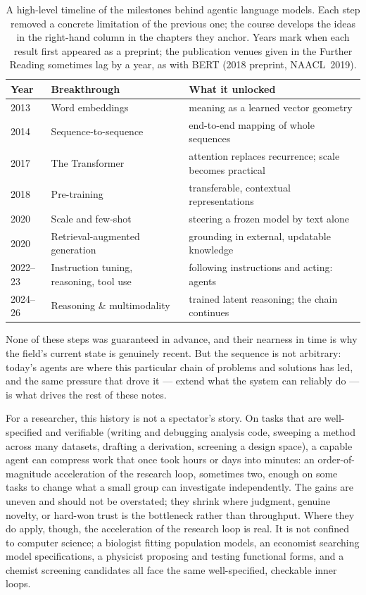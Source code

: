 \begin{table}[t]
\centering
\setlength{\belowcaptionskip}{8pt}
\caption{A high-level timeline of the milestones behind agentic language models.
Each step removed a concrete limitation of the previous one; the course develops the ideas in the right-hand column in the chapters they anchor.
Years mark when each result first appeared as a preprint; the publication venues given in the Further Reading sometimes lag by a year, as with BERT (2018 preprint, NAACL~2019).}
\label{table:AgenticTimeline}
\small
\begin{tabular}{@{}l l p{6.8cm}@{}}
\toprule
Year & Breakthrough & \raggedright What it unlocked \tabularnewline
\midrule
2013  & Word embeddings                   & \raggedright meaning as a learned vector geometry \tabularnewline
2014  & Sequence-to-sequence              & \raggedright end-to-end mapping of whole sequences \tabularnewline
2017  & The Transformer                   & \raggedright attention replaces recurrence; scale becomes practical \tabularnewline
2018  & Pre-training                      & \raggedright transferable, contextual representations \tabularnewline
2020  & Scale and few-shot                & \raggedright steering a frozen model by text alone \tabularnewline
2020  & Retrieval-augmented generation    & \raggedright grounding in external, updatable knowledge \tabularnewline
2022--23 & Instruction tuning, reasoning, tool use & \raggedright following instructions and acting: agents \tabularnewline
2024--26 & Reasoning \& multimodality     & \raggedright trained latent reasoning; the chain continues \tabularnewline
\bottomrule
\end{tabular}
\end{table}

None of these steps was guaranteed in advance, and their nearness in time is why the field's current state is genuinely recent.
But the sequence is not arbitrary: today's agents are where this particular chain of problems and solutions has led, and the same pressure that drove it --- extend what the system can reliably do --- is what drives the rest of these notes.

For a researcher, this history is not a spectator's story.
On tasks that are well-specified and verifiable (writing and debugging analysis code, sweeping a method across many datasets, drafting a derivation, screening a design space), a capable agent can compress work that once took hours or days into minutes: an order-of-magnitude acceleration of the research loop, sometimes two, enough on some tasks to change what a small group can investigate independently.
The gains are uneven and should not be overstated; they shrink where judgment, genuine novelty, or hard-won trust is the bottleneck rather than throughput.
Where they do apply, though, the acceleration of the research loop is real.
It is not confined to computer science; a biologist fitting population models, an economist searching model specifications, a physicist proposing and testing functional forms, and a chemist screening candidates all face the same well-specified, checkable inner loops.


